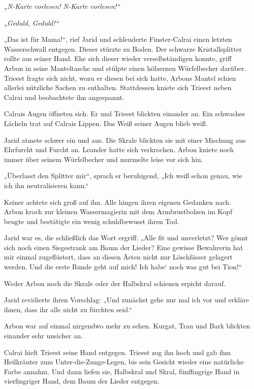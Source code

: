 \textit{„N-Karte vorlesen! N-Karte vorlesen!“}

\textit{„Geduld, Geduld!“}



\trennzeichen



„Das ist für Mama!“, rief Jarid und schleuderte Finster-Calrai einen letzten Wasserschwall entgegen. Dieser stürzte zu Boden. Der schwarze Kristallsplitter rollte aus seiner Hand. Ehe sich dieser wieder verselbständigen konnte, griff Arbon in seine Manteltasche und stülpte einen hölzernen Würfelbecher darüber. Trieest fragte sich nicht, wozu er diesen bei sich hatte, Arbons Mantel schien allerlei nützliche Sachen zu enthalten. Stattdessen kniete sich Trieest neben Calrai und beobachtete ihn angespannt.

Calrais Augen öffneten sich. Er und Trieest blickten einander an. Ein schwaches Lächeln trat auf Calrais Lippen. Das Weiß seiner Augen blieb weiß.

Jarid atmete schwer ein und aus. Die Skrale blickten sie mit einer Mischung aus Ehrfurcht und Furcht an. Leander hatte sich verkrochen. Arbon kniete noch immer über seinem Würfelbecher und murmelte leise vor sich hin.

„Überlasst den Splitter mir“, sprach er beruhigend, „Ich weiß schon genau, wie ich ihn neutralisieren kann.“

Keiner achtete sich groß auf ihn. Alle hingen ihren eigenen Gedanken nach. Arbon kroch zur kleinen Wassermagierin mit dem Armbrustbolzen im Kopf beugte und bestätigte ein wenig schuldbewusst ihren Tod.

Jarid war es, die schließlich das Wort ergriff: „Alle fit und unverletzt? Wer gönnt sich noch einen Siegestrank am Baum der Lieder? Eine gewisse Bewahrerin hat mir einmal zugeflüstert, dass an diesen Ästen nicht nur Löschfässer gelagert werden. Und die erste Runde geht auf mich! Ich habe‘ noch was gut bei Tion!“

Weder Arbon noch die Skrale oder der Halbskral schienen erpicht darauf.

Jarid revidierte ihren Vorschlag: „Und zunächst gehe nur mal ich vor und erkläre ihnen, dass ihr alle nicht zu fürchten seid.“

Arbon war auf einmal nirgendwo mehr zu sehen. Kurgat, Tran und Bark blickten einander sehr unsicher an.

Calrai hielt Trieest seine Hand entgegen. Trieest zog ihn hoch und gab ihm Heilkräuter zum Unter-die-Zunge-Legen, bis sein Gesicht wieder eine natürliche Farbe annahm. Und dann liefen sie, Halbskral und Skral, fünffingrige Hand in vierfingriger Hand, dem Baum der Lieder entgegen.

